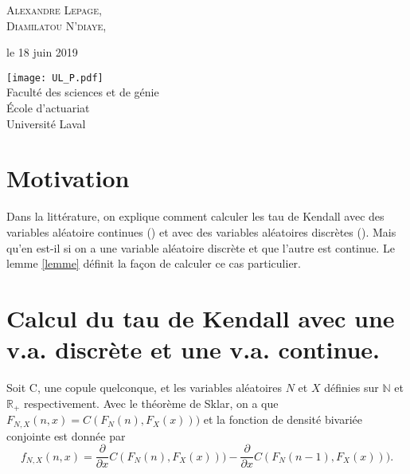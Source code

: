 \documentclass{article}
\begin{document}
\begin{titlepage}
		\vspace{0.5\baselineskip} %
		
		{\scshape\Large Alexandre Lepage, \\
			Diamilatou N'diaye, \\} %
		
		\vspace*{5\baselineskip}
		
		le 18 juin 2019
		
		\vspace{0.5\baselineskip} %
		
		\vfill %
		
		
		\texttt{[image: UL\_P.pdf]}\\
		
		Faculté des sciences et de génie\\
		École d'actuariat\\
		Université Laval\\     
	\end{titlepage}
	\newpage
	
	\section{Motivation}
	Dans la littérature, on explique comment calculer les tau de Kendall avec des variables aléatoire continues (\cite{Everything}) et avec des variables aléatoires discrètes (\cite{Nikoloulopoulos_Kendall_discret}). Mais qu'en est-il si on a une variable aléatoire discrète et que l'autre est continue. Le lemme \ref{lemme} définit la façon de calculer ce cas particulier.\\
	
	\section{Calcul du tau de Kendall avec une v.a. discrète et une v.a. continue.}
	Soit C, une copule quelconque, et les variables aléatoires $N$ et $X$ définies sur $\mathbb{N}$ et $\mathbb{R}_+$ respectivement.
	Avec le théorème de Sklar, on a que $F_{N,X}(n,x) = C(F_N(n), F_X(x)))$ et la fonction de densité bivariée conjointe est donnée par 
	\begin{equation*}
		f_{N,X}(n,x) =  \frac{\partial}{\partial x} C(F_N(n), F_X(x))) - \frac{\partial}{\partial x} C(F_N(n-1), F_X(x))).
	\end{equation*}
	
\end{document}
